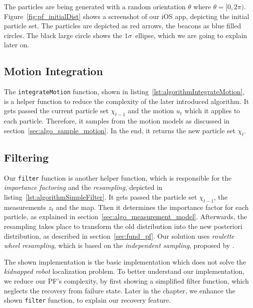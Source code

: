 The particles are being generated with a random orientation $\theta$ where $\theta = [0, 2\pi)$. Figure~\ref{fig:pf_initialDist} shows a screenshot of our iOS app, depicting the initial particle set. The particles are depicted as red arrows, the beacons as blue filled circles. The black large circle shows the $1\sigma$~ellipse, which we are going to explain later on.


\subsection{Motion Integration}
The \texttt{integrateMotion} function, shown in listing~\ref{lst:algorithmIntegrateMotion}, is a helper function to reduce the complexity of the later introduced algorithm. It gets passed the current particle set $\chi_{t-1}$ and the motion $u_t$ which it applies to each particle. Therefore, it samples from the motion models as discussed in section~\ref{sec:algo_sample_motion}. In the end, it returns the new particle set $\chi_t$.




\subsection{Filtering}
Our \texttt{filter} function is another helper function, which is responsible for the \emph{importance factoring} and the \emph{resampling}, depicted in listing~\ref{lst:algorithmSimpleFilter}. It gets passed the particle set $\chi_{t-1}$, the measurements $z_t$ and the map. Then it determines the importance factor for each particle, as explained in section~\ref{sec:algo_measurement_model}. Afterwards, the resampling takes place to transform the old distribution into the new posteriori distribution, as described in section~\ref{sec:fund_pf}. Our solution uses \emph{roulette wheel resampling}, which is based on the \emph{independent sampling}, proposed by \citet[p. 108--111]{thrun:prob_robo}.

 The shown implementation is the basic implementation which does not solve the \emph{kidnapped robot} localization problem. To better understand our implementation, we reduce our \acs{PF}'s complexity, by first showing a simplified filter function, which neglects the recovery from failure state. Later in the chapter, we enhance the shown \texttt{filter} function, to explain our recovery feature. 




